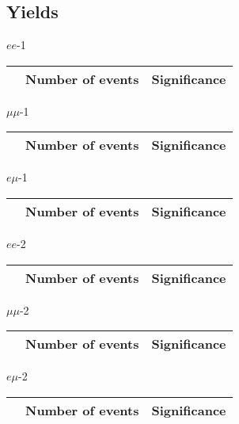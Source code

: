 \subsection{Yields}
\begin{frame}{$ee$-1}
\vspace{5mm}
\begin{tabular}{|c|c|c|}
\hline
& Number of events & Significance \\
\hline

\end{tabular}
\end{frame}

\begin{frame}{$\mu\mu$-1}
\vspace{5mm}
\begin{tabular}{|c|c|c|}
\hline
& Number of events & Significance \\
\hline

\end{tabular}
\end{frame}

\begin{frame}{$e\mu$-1}
\vspace{5mm}
\begin{tabular}{|c|c|c|}
\hline
& Number of events & Significance \\
\hline

\end{tabular}
\end{frame}

\begin{frame}{$ee$-2}
\vspace{5mm}
\begin{tabular}{|c|c|c|}
\hline
& Number of events & Significance \\
\hline

\end{tabular}
\end{frame}

\begin{frame}{$\mu\mu$-2}
\vspace{5mm}
\begin{tabular}{|c|c|c|}
\hline
& Number of events & Significance \\
\hline

\end{tabular}
\end{frame}

\begin{frame}{$e\mu$-2}
\vspace{5mm}
\begin{tabular}{|c|c|c|}
\hline
& Number of events & Significance \\
\hline

\end{tabular}
\end{frame}

